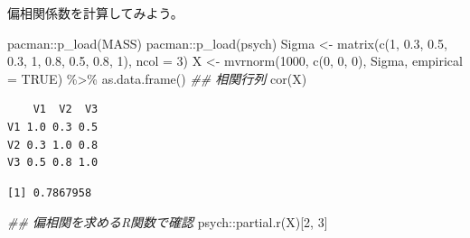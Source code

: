 \documentclass[
  a4paper,
]{ltjsbook}
\newenvironment{Shaded}{\begin{snugshade}}{\end{snugshade}}
\newcommand{\AttributeTok}[1]{\textcolor[rgb]{0.40,0.45,0.13}{#1}}
\newcommand{\ConstantTok}[1]{\textcolor[rgb]{0.56,0.35,0.01}{#1}}
\newcommand{\DecValTok}[1]{\textcolor[rgb]{0.68,0.00,0.00}{#1}}
\newcommand{\DocumentationTok}[1]{\textcolor[rgb]{0.37,0.37,0.37}{\textit{#1}}}
\newcommand{\FloatTok}[1]{\textcolor[rgb]{0.68,0.00,0.00}{#1}}
\newcommand{\FunctionTok}[1]{\textcolor[rgb]{0.28,0.35,0.67}{#1}}
\newcommand{\NormalTok}[1]{\textcolor[rgb]{0.00,0.23,0.31}{#1}}
\newcommand{\OtherTok}[1]{\textcolor[rgb]{0.00,0.23,0.31}{#1}}
\newcommand{\SpecialCharTok}[1]{\textcolor[rgb]{0.37,0.37,0.37}{#1}}
\begin{document}
偏相関係数を計算してみよう。

\begin{Shaded}
\begin{Highlighting}[]
\NormalTok{pacman}\SpecialCharTok{::}\FunctionTok{p\_load}\NormalTok{(MASS)}
\NormalTok{pacman}\SpecialCharTok{::}\FunctionTok{p\_load}\NormalTok{(psych)}
\NormalTok{Sigma }\OtherTok{\textless{}{-}} \FunctionTok{matrix}\NormalTok{(}\FunctionTok{c}\NormalTok{(}\DecValTok{1}\NormalTok{, }\FloatTok{0.3}\NormalTok{, }\FloatTok{0.5}\NormalTok{, }\FloatTok{0.3}\NormalTok{, }\DecValTok{1}\NormalTok{, }\FloatTok{0.8}\NormalTok{, }\FloatTok{0.5}\NormalTok{, }\FloatTok{0.8}\NormalTok{, }\DecValTok{1}\NormalTok{), }\AttributeTok{ncol =} \DecValTok{3}\NormalTok{)}
\NormalTok{X }\OtherTok{\textless{}{-}} \FunctionTok{mvrnorm}\NormalTok{(}\DecValTok{1000}\NormalTok{, }\FunctionTok{c}\NormalTok{(}\DecValTok{0}\NormalTok{, }\DecValTok{0}\NormalTok{, }\DecValTok{0}\NormalTok{), Sigma, }\AttributeTok{empirical =} \ConstantTok{TRUE}\NormalTok{) }\SpecialCharTok{\%\textgreater{}\%} \FunctionTok{as.data.frame}\NormalTok{()}
\DocumentationTok{\#\# 相関行列}
\FunctionTok{cor}\NormalTok{(X)}
\end{Highlighting}
\end{Shaded}

\begin{verbatim}
    V1  V2  V3
V1 1.0 0.3 0.5
V2 0.3 1.0 0.8
V3 0.5 0.8 1.0
\end{verbatim}

\begin{Shaded}
\end{Shaded}

\begin{verbatim}
[1] 0.7867958
\end{verbatim}

\begin{Shaded}
\begin{Highlighting}[]
\DocumentationTok{\#\# 偏相関を求めるR関数で確認}
\NormalTok{psych}\SpecialCharTok{::}\FunctionTok{partial.r}\NormalTok{(X)[}\DecValTok{2}\NormalTok{, }\DecValTok{3}\NormalTok{]}
\end{Highlighting}
\end{Shaded}
\end{document}
